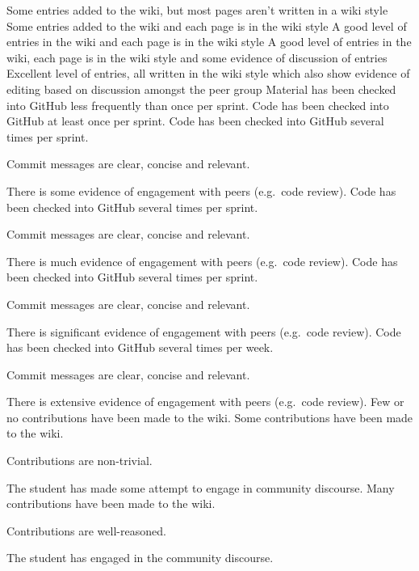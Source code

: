 \documentclass{../../fal_assignment}
\begin{document}
\begin{markingrubric}
	\grade Some entries added to the wiki, but most pages aren't written in a wiki style
	\grade Some entries added to the wiki and each page is in the wiki style
	\grade A good level of entries in the wiki and each page is in the wiki style
	\grade A good level of entries in the wiki, each page is in the wiki style and some evidence of discussion of entries
	\grade Excellent level of entries, all written in the wiki style which also show evidence of editing based on discussion amongst the peer group
%
% 
	\grade \fail Material has been checked into GitHub less frequently than once per sprint.
	\grade Code has been checked into GitHub at least once per sprint.
	\grade Code has been checked into GitHub several times per sprint.
		\par Commit messages are clear, concise and relevant.
		\par There is some evidence of engagement with peers (e.g.\ code review).
	\grade Code has been checked into GitHub several times per sprint.
		\par Commit messages are clear, concise and relevant.
		\par There is much evidence of engagement with peers (e.g.\ code review).
	\grade Code has been checked into GitHub several times per sprint.
		\par Commit messages are clear, concise and relevant.
		\par There is significant evidence of engagement with peers (e.g.\ code review).
	\grade Code has been checked into GitHub several times per week.
		\par Commit messages are clear, concise and relevant.
		\par There is extensive evidence of engagement with peers (e.g.\ code review).
%
        \grade\fail 	Few or no contributions have been made to the wiki.
        \grade 		Some contributions have been made to the wiki.
        \par		Contributions are non-trivial.
        \par		The student has made some attempt to engage in community discourse.
        \grade 		Many contributions have been made to the wiki.
        \par		Contributions are well-reasoned.
        \par		The student has engaged in the community discourse.

\end{markingrubric}
\end{document}

